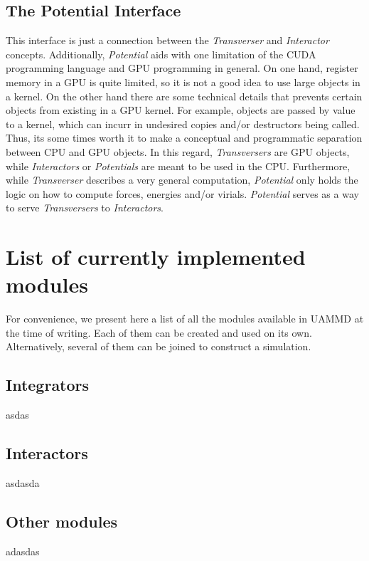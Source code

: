 \documentclass[ twoside,openright,titlepage,numbers=noenddot,%
headinclude,footinclude,cleardoublepage=empty,abstract=on,
BCOR=5mm,paper=a4,fontsize=11pt, dvipsnames
]{scrreprt}
\newcommand{\uammd}{\gls{UAMMD}\xspace}
\newcommand{\gpu}{\gls{GPU}\xspace}
\begin{document}
\section{The Potential Interface} \label{sec:potential}

This interface is just a connection between the \emph{Transverser} and \emph{Interactor} concepts. Additionally, \emph{Potential} aids with one limitation of the CUDA programming language and \gls{GPU} programming in general. On one hand, register memory in a \gpu is quite limited, so it is not a good idea to use large objects in a kernel. On the other hand there are some technical details that prevents certain objects from existing in a \gpu kernel. For example, objects are passed by value to a kernel, which can incurr in undesired copies and/or destructors being called. Thus, its some times worth it to make a conceptual and programmatic separation between CPU and \gpu objects.
In this regard, \emph{Transversers} are \gpu objects, while \emph{Interactors} or \emph{Potentials} are meant to be used in the CPU.
Furthermore, while \emph{Transverser} describes a very general computation, \emph{Potential} only holds the logic on how to compute forces, energies and/or virials.
\emph{Potential} serves as a way to serve \emph{Transversers} to \emph{Interactors}.


\chapter{List of currently implemented modules}\label{sec:modulelist}

For convenience, we present here a list of all the modules available in \uammd at the time of writing. Each of them can be created and used on its own. Alternatively, several of them can be joined to construct a simulation.

\section{Integrators}

asdas

\section{Interactors}

asdasda

\section{Other modules}

adasdas

\newpage

\printbibliography[heading=bibintoc]

\newpage

\cleardoublepage
\cleardoublepage
\newpage
\end{document}
